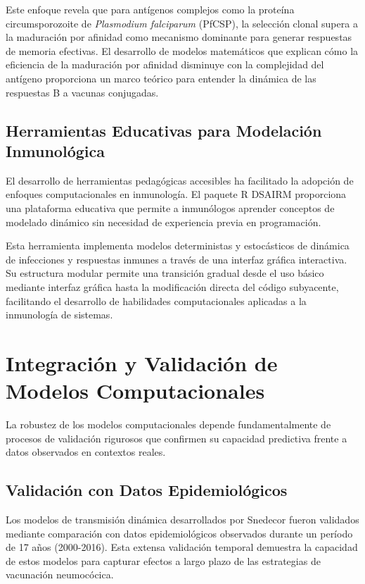 Este enfoque revela que para antígenos complejos como la proteína circumsporozoite de \textit{Plasmodium falciparum} (PfCSP), la selección clonal supera a la maduración por afinidad como mecanismo dominante para generar respuestas de memoria efectivas. El desarrollo de modelos matemáticos que explican cómo la eficiencia de la maduración por afinidad disminuye con la complejidad del antígeno proporciona un marco teórico para entender la dinámica de las respuestas B a vacunas conjugadas.

\subsection{Herramientas Educativas para Modelación Inmunológica}

El desarrollo de herramientas pedagógicas accesibles ha facilitado la adopción de enfoques computacionales en inmunología. El paquete R DSAIRM \cite{Handel2020} proporciona una plataforma educativa que permite a inmunólogos aprender conceptos de modelado dinámico sin necesidad de experiencia previa en programación.

Esta herramienta implementa modelos deterministas y estocásticos de dinámica de infecciones y respuestas inmunes a través de una interfaz gráfica interactiva. Su estructura modular permite una transición gradual desde el uso básico mediante interfaz gráfica hasta la modificación directa del código subyacente, facilitando el desarrollo de habilidades computacionales aplicadas a la inmunología de sistemas.

\section{Integración y Validación de Modelos Computacionales}

La robustez de los modelos computacionales depende fundamentalmente de procesos de validación rigurosos que confirmen su capacidad predictiva frente a datos observados en contextos reales.

\subsection{Validación con Datos Epidemiológicos}

Los modelos de transmisión dinámica desarrollados por Snedecor \cite{Snedecor2020a} fueron validados mediante comparación con datos epidemiológicos observados durante un período de 17 años (2000-2016). Esta extensa validación temporal demuestra la capacidad de estos modelos para capturar efectos a largo plazo de las estrategias de vacunación neumocócica.

